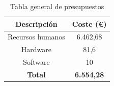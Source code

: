 \begin{table}[H]
    \centering
    \begin{tabular}{|c|c|}
        \hline
        \rowcolor{lightgray}
        \textbf{Descripción} & \textbf{Coste (€)} \\
        \hline
        Recursos humanos & 6.462,68 \\
        \hline
        Hardware & 81,6 \\
        \hline
        Software & 10 \\
        \hline
        \textbf{Total} & \textbf{6.554,28} \\
        \hline
    \end{tabular}
    \caption{Tabla general de presupuestos}
    \label{tab:presupuesto-total}
\end{table}
